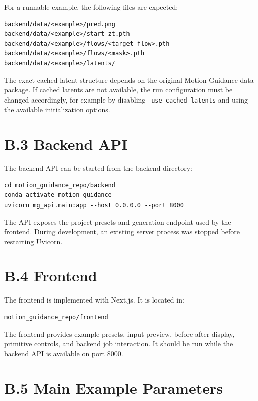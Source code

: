 For a runnable example, the following files are expected:

\begin{verbatim}
backend/data/<example>/pred.png
backend/data/<example>/start_zt.pth
backend/data/<example>/flows/<target_flow>.pth
backend/data/<example>/flows/<mask>.pth
backend/data/<example>/latents/
\end{verbatim}

The exact cached-latent structure depends on the original Motion Guidance data package. If cached latents are not available, the run configuration must be changed accordingly, for example by disabling \texttt{--use\_cached\_latents} and using the available initialization options.

\section*{B.3 Backend API}

The backend API can be started from the backend directory:

\begin{verbatim}
cd motion_guidance_repo/backend
conda activate motion_guidance
uvicorn mg_api.main:app --host 0.0.0.0 --port 8000
\end{verbatim}

The API exposes the project presets and generation endpoint used by the frontend. During development, an existing server process was stopped before restarting Uvicorn.

\section*{B.4 Frontend}

The frontend is implemented with Next.js. It is located in:

\begin{verbatim}
motion_guidance_repo/frontend
\end{verbatim}

The frontend provides example presets, input preview, before-after display, primitive controls, and backend job interaction. It should be run while the backend API is available on port 8000.

\section*{B.5 Main Example Parameters}

